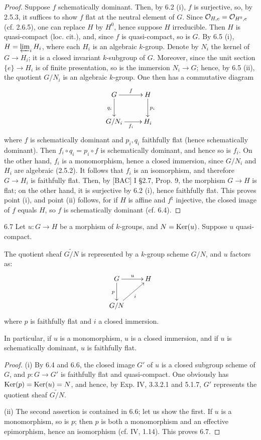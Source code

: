\begin{proof}
Suppose $f$ schematically dominant. Then, by 6.2 (i), $f$ is surjective, so, by 2.5.3, it suffices to show $f$ flat at the neutral element of $G$. Since $\mathcal{O}_{H,e}=\mathcal{O}_{H^0,e}$ (cf. 2.6.5), one can replace $H$ by $H^0$, hence suppose $H$ irreducible. Then $H$ is quasi-compact (loc. cit.), and, since $f$ is quasi-compact, so is $G$. By 6.5 (i), $H=\varprojlim_iH_i$, where each $H_i$ is an algebraic $k$-group. Denote by $N_i$ the kernel of $G\to H_i$; it is a closed invariant $k$-subgroup of $G$. Moreover, since the unit section $\{e\}\to H_i$ is of finite presentation, so is the immersion $N_i\to G$; hence, by 6.5 (ii), the \fpqc quotient $G/N_i$ is an algebraic $k$-group. One then has a commutative diagram
\[
\xymatrix{G\ar[r]^f\ar[d]_{q_i}&H\ar[d]^{p_i}\\G/N_i\ar[r]_{f_i}&H_i}
\]
where $f$ is schematically dominant and $p_i,q_i$ faithfully flat (hence schematically dominant). Then $f_i\circ q_i=p_i\circ f$ is schematically dominant, and hence so is $f_i$. On the other hand, $f_i$ is a monomorphism, hence a closed immersion, since $G/N_i$ and $H_i$ are algebraic (2.5.2). It follows that $f_i$ is an isomorphism, and therefore $G\to H_i$ is faithfully flat. Then, by [BAC] I §2.7, Prop. 9, the morphism $G\to H$ is flat; on the other hand, it is surjective by 6.2 (i), hence faithfully flat. This proves point (i), and point (ii) follows, for if $H$ is affine and $f^\natural$ injective, the closed image of $f$ equals $H$, so $f$ is schematically dominant (cf. 6.4).
\end{proof}
\begin{corollary}{6.7}\label{VIA.6.7}
Let $u:G\to H$ be a morphism of $k$-groups, and $N=\operatorname{Ker}(u)$. Suppose $u$ quasi-compact.
\begin{enumeratei}
\item The quotient \fpqc sheaf $\widetilde{G/N}$ is represented by a $k$-group scheme $G/N$, and $u$ factors as:
\[
\xymatrix{G\ar[r]^u\ar[d]_p&H\\G/N\ar[ur]_i&}
\]
where $p$ is faithfully flat and $i$ a closed immersion.
\item In particular, if $u$ is a monomorphism, $u$ is a closed immersion, and if $u$ is schematically dominant, $u$ is faithfully flat.
\end{enumeratei}
\end{corollary}
\begin{proof}
(i) By 6.4 and 6.6, the closed image $G'$ of $u$ is a closed subgroup scheme of $G$, and $p:G\to G'$ is faithfully flat and quasi-compact. One obviously has $\operatorname{Ker}(p)=\operatorname{Ker}(u)=N$, and hence, by Exp. IV, 3.3.2.1 and 5.1.7, $G'$ represents the quotient \fpqc sheaf $\widetilde{G/N}$.

(ii) The second assertion is contained in 6.6; let us show the first. If $u$ is a monomorphism, so is $p$; then $p$ is both a monomorphism and an effective epimorphism, hence an isomorphism (cf. IV, 1.14). This proves 6.7.
\end{proof}
